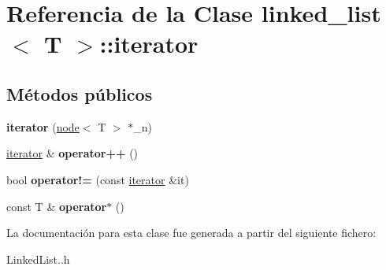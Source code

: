 \hypertarget{classlinked__list_1_1iterator}{}\section{Referencia de la Clase linked\+\_\+list$<$ T $>$\+:\+:iterator}
\label{classlinked__list_1_1iterator}
\subsection*{Métodos públicos}
\begin{DoxyCompactItemize}
\item 
\mbox{\label{classlinked__list_1_1iterator_a509f40c4aace70c08014bcf7c31a3c9a}} 
{\bfseries iterator} (\hyperlink{classnode}{node}$<$ T $>$ $\ast$\+\_\+n)
\item 
\mbox{\label{classlinked__list_1_1iterator_afde8572a561e469f96a23e91acdc501c}} 
\hyperlink{classlinked__list_1_1iterator}{iterator} \& {\bfseries operator++} ()
\item 
\mbox{\label{classlinked__list_1_1iterator_aef0f06b8677cedceaa3e709fbc5f65cb}} 
bool {\bfseries operator!=} (const \hyperlink{classlinked__list_1_1iterator}{iterator} \&it)
\item 
\mbox{\label{classlinked__list_1_1iterator_ab6f6fa8309ba57362dbc37f6f3e605db}} 
const T \& {\bfseries operator$\ast$} ()
\end{DoxyCompactItemize}


La documentación para esta clase fue generada a partir del siguiente fichero\+:\begin{DoxyCompactItemize}
\item 
Linked\+List..\+h\end{DoxyCompactItemize}
